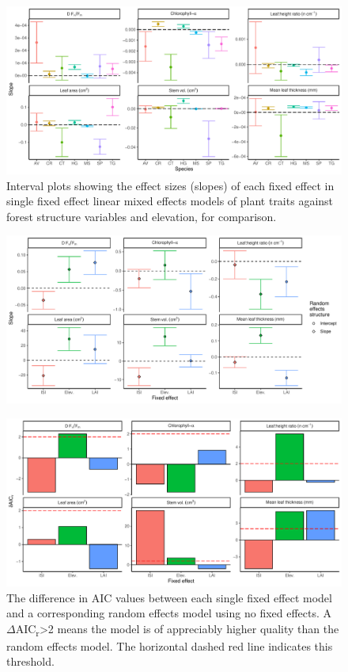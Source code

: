 \documentclass[a4paper, 11pt]{article}
\begin{document}
\begin{figure}[H]
\includegraphics[width=\textwidth]{traits_elev_slopes}
\centering
\caption{Interval plots showing the effect sizes (slopes) of each fixed effect in single fixed effect linear mixed effects models of plant traits against forest structure variables and elevation, for comparison.}
\label{fig:traits_elev_slopes}
\end{figure}

\begin{figure}[H]
\includegraphics[width=\textwidth]{single_pred_slope}
\centering
\caption{}
\label{fig:single_pred_slope}
\end{figure}

\begin{figure}[H]
\includegraphics[width=\textwidth]{single_pred_daic}
\centering
\caption{The difference in AIC values between each single fixed effect model and a corresponding random effects model using no fixed effects. A $\Delta$AIC\textsubscript{r}\textgreater{}2 means the model is of appreciably higher quality than the random effects model. The horizontal dashed red line indicates this threshold.}
\label{fig:single_pred_daic}
\end{figure}
\end{document}
